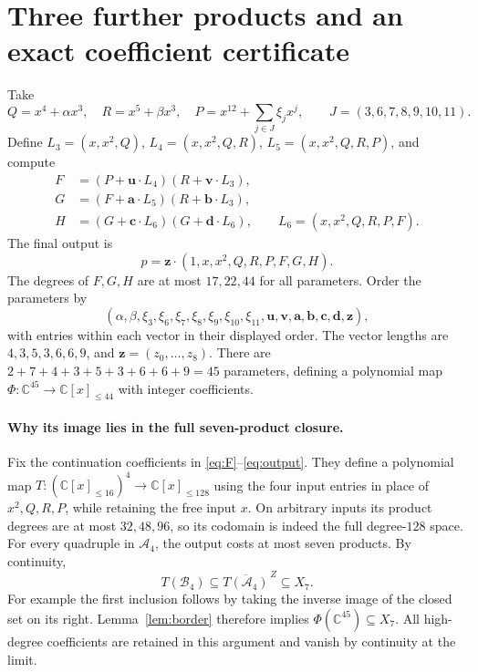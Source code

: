 \documentclass[11pt]{article}
\newcommand{\C}{\mathbb C}
\newcommand{\V}[1]{\C[x]_{\le #1}}
\newcommand{\cl}{\overline}
\begin{document}
\section{Three further products and an exact coefficient certificate}
Take
\[
 Q=x^4+\alpha x^3,\quad R=x^5+\beta x^3,\quad
 P=x^{12}+\sum_{j\in J}\xi_jx^j,\qquad J=(3,6,7,8,9,10,11).
\]
Define $L_3=(x,x^2,Q)$, $L_4=(x,x^2,Q,R)$, $L_5=(x,x^2,Q,R,P)$,
and compute
\begin{align}
 F&=(P+\mathbf u\cdot L_4)(R+\mathbf v\cdot L_3),\label{eq:F}\\
 G&=(F+\mathbf a\cdot L_5)(R+\mathbf b\cdot L_3),\label{eq:G}\\
 H&=(G+\mathbf c\cdot L_6)(G+\mathbf d\cdot L_6),
 \qquad L_6=(x,x^2,Q,R,P,F).\label{eq:H}
\end{align}
The final output is
\begin{equation}\label{eq:output}
 p=\mathbf z\cdot(1,x,x^2,Q,R,P,F,G,H).
\end{equation}
The degrees of $F,G,H$ are at most $17,22,44$ for all parameters.
Order the parameters by
\begin{equation}\label{eq:parameters}
 (\alpha,\beta,\xi_3,\xi_6,\xi_7,\xi_8,\xi_9,\xi_{10},\xi_{11},
 \mathbf u,\mathbf v,\mathbf a,\mathbf b,\mathbf c,\mathbf d,\mathbf z),
\end{equation}
with entries within each vector in their displayed order. The vector lengths
are $4,3,5,3,6,6,9$, and $\mathbf z=(z_0,\ldots,z_8)$.
There are $2+7+4+3+5+3+6+6+9=45$ parameters, defining a polynomial map
$\Phi:\C^{45}\to\V{44}$ with integer coefficients.

\paragraph{Why its image lies in the full seven-product closure.}
Fix the continuation coefficients in \eqref{eq:F}--\eqref{eq:output}.
They define a polynomial map $T:(\V{16})^4\to\V{128}$ using the four
input entries in place of $x^2,Q,R,P$, while retaining the free input $x$.
On arbitrary inputs its product degrees are at most $32,48,96$, so its
codomain is indeed the full degree-$128$ space. For every quadruple in
$\mathcal A_4$, the output costs at most seven products. By continuity,
\[
 T(\mathcal B_4)\subseteq\cl{T(\mathcal A_4)}^{\,Z}\subseteq X_7.
\]
For example the first inclusion follows by taking the inverse image of the
closed set on its right. Lemma~\ref{lem:border} therefore implies
$\Phi(\C^{45})\subseteq X_7$. All high-degree coefficients are retained
in this argument and vanish by continuity at the limit.
\end{document}
